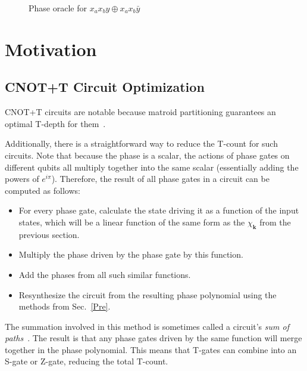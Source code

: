 \begin{figure*}[t]
  \centering
  \begin{minipage}{\textwidth}
    \centering
    \scalebox{0.9} {
      
    }
    \scalebox{0.9} {
      
    }
  \end{minipage}
  \caption{Phase oracle for $x_a x_b y \oplus x_a x_b \bar{y}$}
  \label{fig-series-all}
  \vspace{-0.5cm}  
\end{figure*}

\section{Motivation}
\label{Mot}
\subsection{CNOT+T Circuit Optimization}
\label{Mot:CnotOpt}
CNOT+T circuits are notable because matroid partitioning guarantees an optimal T-depth
for them~\cite{bib-amy-matroid}.

Additionally, there is a straightforward way to reduce the T-count for such circuits.
Note that because the phase is a scalar, the actions of phase gates on different
qubits all multiply together into the same scalar (essentially adding the powers
of $e^{i \pi}$). Therefore, the result of all phase gates in a circuit
can be computed as follows:

\begin{itemize}
\item For every phase gate, calculate the state driving it as a function of the
  input states, which will be a linear function of the same form as the
  $\chi_{\mathbf{k}}$ from the previous section.
\item Multiply the phase driven by the phase gate by this function.
\item Add the phases from all such similar functions.
\item Resynthesize the circuit from the resulting phase polynomial using
  the methods from Sec.~\ref{Pre}.
\end{itemize}

The summation involved in this method is sometimes called a circuit's \emph{sum of paths}~\cite{bib-amy-cnot}. The result is that any phase gates driven by the same function will merge together in the phase polynomial. This means that T-gates can combine into an S-gate or Z-gate, reducing the total T-count.

